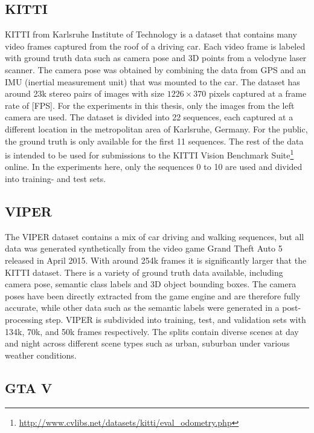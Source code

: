 		\subsection{KITTI}
			KITTI from Karlsruhe Institute of Technology \cite{geiger2013vision} is a dataset that contains many video frames captured from the roof of a driving car.
			Each video frame is labeled with ground truth data such as camera pose and 3D points from a velodyne laser scanner.
			The camera pose was obtained by combining the data from GPS and an IMU (inertial measurement unit) that was mounted to the car.
			The dataset has around 23k stereo pairs of images with size $1226 \times 370$ pixels captured at a frame rate of [FPS].
			For the experiments in this thesis, only the images from the left camera are used.
			The dataset is divided into 22 sequences, each captured at a different location in the metropolitan area of Karlsruhe, Germany.
			For the public, the ground truth is only available for the first 11 sequences.
			The rest of the data is intended to be used for submissions to the KITTI Vision Benchmark Suite\footnote{\url{http://www.cvlibs.net/datasets/kitti/eval_odometry.php}} 
			online.
			In the experiments here, only the sequences 0 to 10 are used and divided into training- and test sets.
		
		\subsection{VIPER}
			The VIPER dataset \cite{richter2017playing} contains a mix of car driving and walking sequences, but all data was generated synthetically from the video game Grand Theft Auto 5 released in April 2015.
			With around 254k frames it is significantly larger that the KITTI dataset.
			There is a variety of ground truth data available, including camera pose, semantic class labels and 3D object bounding boxes.
			The camera poses have been directly extracted from the game engine and are therefore fully accurate, while other data such as the semantic labels were generated in a post-processing step.
			VIPER is subdivided into training, test, and validation sets with 134k, 70k, and 50k frames respectively.
			The splits contain diverse scenes at day and night across different scene types such as urban, suburban under various weather conditions.
			
		\subsection{GTA V}
		
